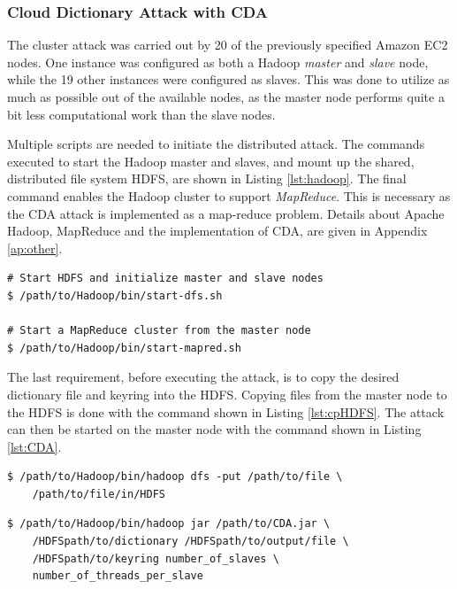 \documentclass[pdftex,english,10pt,b5paper,twoside]{book}
\begin{document}
\subsubsection{Cloud Dictionary Attack with \ac{CDA}}

The cluster attack was carried out by 20 of the previously specified Amazon EC2
nodes. One instance was configured as both a Hadoop \emph{master} and
\emph{slave} node, while the 19 other instances were configured as slaves.
This was done to utilize as much as possible out of the available nodes, as the
master node performs quite a bit less computational work than the slave nodes.

Multiple scripts are needed to initiate the distributed attack.
The commands executed to start the Hadoop master and slaves, and mount up the
shared, distributed file system \ac{HDFS}, are shown in Listing
\ref{lst:hadoop}. The final command enables the Hadoop cluster to support
\emph{MapReduce}. This is necessary as the \ac{CDA} attack is implemented as a
map-reduce problem. Details about Apache Hadoop, MapReduce and the
implementation of \ac{CDA}, are given in Appendix \ref{ap:other}.

\lstset{language=bash, label=lst:hadoop, caption=Starting Hadoop Cluster with HDFS}
\begin{lstlisting}
# Start HDFS and initialize master and slave nodes
$ /path/to/Hadoop/bin/start-dfs.sh

# Start a MapReduce cluster from the master node
$ /path/to/Hadoop/bin/start-mapred.sh
\end{lstlisting}

The last requirement, before executing the attack, is to copy the
desired dictionary file and keyring into the \ac{HDFS}. Copying files from the
master node to the \ac{HDFS} is done with the command shown in Listing
\ref{lst:cpHDFS}. The attack can then be started on the master node with the
command shown in Listing \ref{lst:CDA}.

\lstset{language=bash, label=lst:cpHDFS, caption=Copying files into HDFS}
\begin{lstlisting}
$ /path/to/Hadoop/bin/hadoop dfs -put /path/to/file \
    /path/to/file/in/HDFS
\end{lstlisting}

\lstset{language=bash, label=lst:CDA, caption=Executing the CDA Attack}
\begin{lstlisting}
$ /path/to/Hadoop/bin/hadoop jar /path/to/CDA.jar \
    /HDFSpath/to/dictionary /HDFSpath/to/output/file \
    /HDFSpath/to/keyring number_of_slaves \
    number_of_threads_per_slave
\end{lstlisting}
\end{document}
